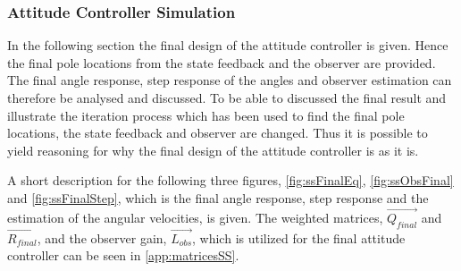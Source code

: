 \subsubsection{Attitude Controller Simulation}
In the following section the final design of the attitude controller is given. Hence the final pole locations from the state feedback and the observer are provided. The final angle response, step response of the angles and observer estimation can therefore be analysed and discussed. To be able to discussed the final result and illustrate the iteration process which has been used to find the final pole locations, the state feedback and observer are changed. Thus it is possible to yield reasoning for why the final design of the attitude controller is as it is.

A short description for the following three figures, \autoref{fig:ssFinalEq}, \autoref{fig:ssObsFinal} and \autoref{fig:ssFinalStep}, which is the final angle response, step response and the estimation of the angular velocities, is given. The weighted matrices, $\vec{Q_{final}}$ and $\vec{R_{final}}$, and the observer gain, $\vec{L_{obs}}$, which is utilized for the final attitude controller can be seen in \autoref{app:matricesSS}.

